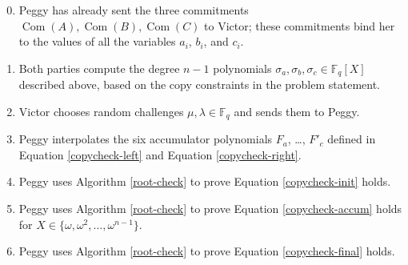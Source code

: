 \begin{algo}
\leavevmode
\begin{enumerate}
\setcounter{enumi}{-1}
\item
  Peggy has already sent the three commitments
  \(\operatorname{Com}(A),\operatorname{Com}(B),\operatorname{Com}(C)\)
  to Victor; these commitments bind her to the values of all the
  variables \(a_{i}\), \(b_{i}\), and \(c_{i}\).
\item
  Both parties compute the degree \(n - 1\) polynomials
  \(\sigma_{a},\sigma_{b},\sigma_{c} \in {\mathbb{F}}_{q}[ X]\)
  described above, based on the copy constraints in the problem
  statement.
\item
  Victor chooses random challenges \(\mu,\lambda \in {\mathbb{F}}_{q}\)
  and sends them to Peggy.
\item
  Peggy interpolates the six accumulator polynomials \(F_{a}\), \ldots,
  \(F'_{c}\) defined in Equation \eqref{copycheck-left}
  and Equation \eqref{copycheck-right}.
\item
  Peggy uses Algorithm \ref{root-check} to prove
  Equation \eqref{copycheck-init} holds.
\item
  Peggy uses Algorithm \ref{root-check} to prove
  Equation \eqref{copycheck-accum} holds for
  \(X \in \{ \omega,\omega^{2},\ldots,\omega^{n - 1} \}\).
\item
  Peggy uses Algorithm \ref{root-check} to prove
  Equation \eqref{copycheck-final} holds.
\end{enumerate}
\end{algo}
